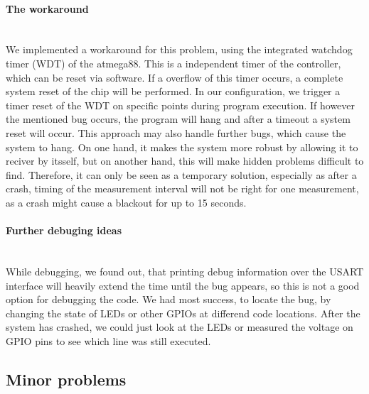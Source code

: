\documentclass[a4paper]{scrreprt}
\begin{document}
\paragraph{The workaround}\hspace{1cm}\\
We implemented a workaround for this problem, using the integrated watchdog
timer (WDT) of the atmega88. This is a independent timer of the
controller, which can be reset via software. If a overflow of this timer occurs,
a complete system reset of the chip will be performed. In our configuration, we
trigger a timer reset of the WDT on specific points during program execution.
If however the mentioned bug occurs, the program will hang and after a timeout
a system reset will occur. 
This approach may also handle further bugs, which cause the system to hang.
On one hand, it makes the system more robust by allowing it to reciver by itsself,
but on another hand, this will make hidden problems difficult to find. 
Therefore, it can only be seen as a temporary solution, especially as after a crash,
timing of the measurement interval will not be right
for one measurement, as a crash might cause a blackout for up to 15 seconds.
\paragraph{Further debuging ideas}\hspace{1cm}\\
While debugging, we found out, that printing debug information over the USART
interface will heavily extend the time until the bug appears, so this is not a
good option for debugging the code. We had most success, to locate the bug,
by changing the state of LEDs or other GPIOs at differend code locations. After
the system has crashed, we could just look at the LEDs or measured the voltage on
GPIO pins to see which line was still executed.
\subsection{Minor problems}
\end{document}
